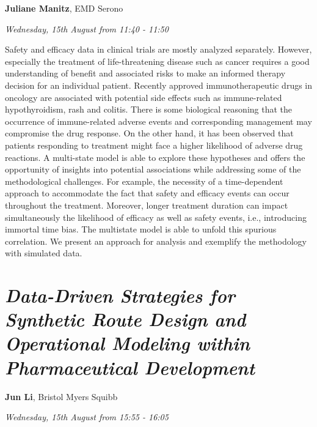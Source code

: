 \documentclass[]{book}
\theoremstyle{definition}
\theoremstyle{definition}
\theoremstyle{definition}
\theoremstyle{remark}
\begin{document}
\textbf{Juliane Manitz}, EMD Serono

\emph{Wednesday, 15th August from 11:40 - 11:50}

Safety and efficacy data in clinical trials are mostly analyzed
separately. However, especially the treatment of life-threatening
disease such as cancer requires a good understanding of benefit and
associated risks to make an informed therapy decision for an individual
patient. Recently approved immunotherapeutic drugs in oncology are
associated with potential side effects such as immune-related
hypothyroidism, rash and colitis. There is some biological reasoning
that the occurrence of immune-related adverse events and corresponding
management may compromise the drug response. On the other hand, it has
been observed that patients responding to treatment might face a higher
likelihood of adverse drug reactions. A multi-state model is able to
explore these hypotheses and offers the opportunity of insights into
potential associations while addressing some of the methodological
challenges. For example, the necessity of a time-dependent approach to
accommodate the fact that safety and efficacy events can occur
throughout the treatment. Moreover, longer treatment duration can impact
simultaneously the likelihood of efficacy as well as safety events,
i.e., introducing immortal time bias. The multistate model is able to
unfold this spurious correlation. We present an approach for analysis
and exemplify the methodology with simulated data.

\hypertarget{data-driven-strategies-for-synthetic-route-design-and-operational-modeling-within-pharmaceutical-development}{%
\section{\texorpdfstring{\emph{Data-Driven Strategies for Synthetic
Route Design and Operational Modeling within Pharmaceutical
Development}}{Data-Driven Strategies for Synthetic Route Design and Operational Modeling within Pharmaceutical Development}}\label{data-driven-strategies-for-synthetic-route-design-and-operational-modeling-within-pharmaceutical-development}}

\textbf{Jun Li}, Bristol Myers Squibb

\emph{Wednesday, 15th August from 15:55 - 16:05}
\end{document}

